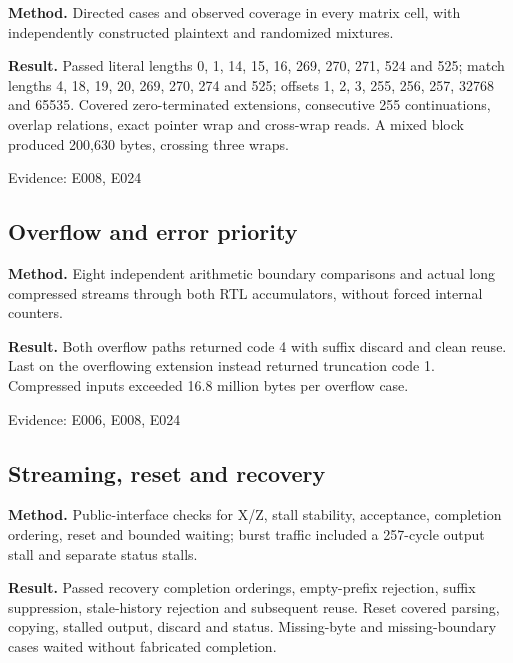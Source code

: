 \documentclass[11pt,a4paper]{article}
\begin{document}
\textbf{Method.} Directed cases and observed coverage in every matrix cell,\allowbreak{} with independently constructed plaintext and randomized mixtures.

\textbf{Result.} Passed literal lengths 0,\allowbreak{} 1,\allowbreak{} 14,\allowbreak{} 15,\allowbreak{} 16,\allowbreak{} 269,\allowbreak{} 270,\allowbreak{} 271,\allowbreak{} 524 and 525; match lengths 4,\allowbreak{} 18,\allowbreak{} 19,\allowbreak{} 20,\allowbreak{} 269,\allowbreak{} 270,\allowbreak{} 274 and 525; offsets 1,\allowbreak{} 2,\allowbreak{} 3,\allowbreak{} 255,\allowbreak{} 256,\allowbreak{} 257,\allowbreak{} 32768 and 65535. Covered zero-terminated extensions,\allowbreak{} consecutive 255 continuations,\allowbreak{} overlap relations,\allowbreak{} exact pointer wrap and cross-wrap reads. A mixed block produced 200,\allowbreak{}630 bytes,\allowbreak{} crossing three wraps.

{\small Evidence: E008,\allowbreak{} E024}

\subsection{Overflow and error priority}

\textbf{Method.} Eight independent arithmetic boundary comparisons and actual long compressed streams through both RTL accumulators,\allowbreak{} without forced internal counters.

\textbf{Result.} Both overflow paths returned code 4 with suffix discard and clean reuse. Last on the overflowing extension instead returned truncation code 1. Compressed inputs exceeded 16.8 million bytes per overflow case.

{\small Evidence: E006,\allowbreak{} E008,\allowbreak{} E024}

\subsection{Streaming,\allowbreak{} reset and recovery}

\textbf{Method.} Public-interface checks for X/\allowbreak{}Z,\allowbreak{} stall stability,\allowbreak{} acceptance,\allowbreak{} completion ordering,\allowbreak{} reset and bounded waiting; burst traffic included a 257-cycle output stall and separate status stalls.

\textbf{Result.} Passed recovery completion orderings,\allowbreak{} empty-prefix rejection,\allowbreak{} suffix suppression,\allowbreak{} stale-history rejection and subsequent reuse. Reset covered parsing,\allowbreak{} copying,\allowbreak{} stalled output,\allowbreak{} discard and status. Missing-byte and missing-boundary cases waited without fabricated completion.
\end{document}
